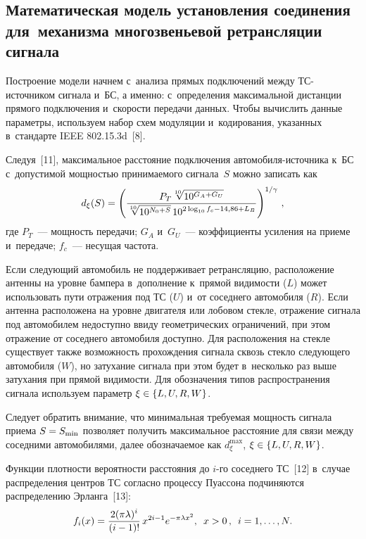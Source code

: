 \begin{multicols}{2}
\section{Математическая модель установления соединения 
для~механизма многозвеньевой ретрансляции сигнала}

     Построение модели начнем с~анализа прямых подключений между  
ТС-ис\-точ\-ни\-ком сигнала и~БС, а именно: с~определения максимальной 
дистанции прямого подключения и~скорости передачи данных. Чтобы 
вычислить данные параметры, используем набор схем модуляции 
и~кодирования, указанных в~стандарте IEEE 802.15.3d~[8].
     
     Следуя~[11], максимальное расстояние подключения  
ав\-то\-мо\-би\-ля-ис\-точ\-ни\-ка к~БС с~допустимой мощ\-ностью  
при\-ни\-ма\-емо\-го сигнала~$S$ можно записать как
     \begin{equation}
     d_\xi(S)= \left( \displaystyle\frac{\displaystyle P_T \sqrt[10]{10^{G_A+G_U}}\mathstrut}{\displaystyle \sqrt[10]{10^{N_0+S}}\,10^{2\log_{10} f_c-14{,}86+L_B}\mathstrut} 
\right)^{1/\gamma}\,,
     \label{e2-ost}
     \end{equation}
где $P_T$~--- мощность передачи; $G_A$ и~$G_U$~--- коэффициенты 
усиления на приеме и~передаче; $f_c$~--- 
несущая частота.

     Если следующий автомобиль не поддерживает ретрансляцию, 
расположение антенны на уровне бампера в~дополнение к~прямой видимости 
($L$) может использовать пути отражения под ТС ($U$) и~от соседнего 
автомобиля ($R$). Если антенна расположена на уровне двигателя или 
лобовом стекле, отражение сигнала под автомобилем недоступно ввиду 
геометрических ограничений, при этом отражение от соседнего автомобиля 
доступно. Для расположения на стекле существует также возможность 
прохождения сигнала сквозь стекло следующего автомобиля ($W$), но 
затухание сигнала при этом будет в~несколько раз выше затухания при 
прямой видимости. Для обозначения типов распространения сигнала 
используем параметр $\xi \hm\in \{L,U,R,W\}$.
     
     Следует обратить внимание, что минимальная требуемая мощность 
сигнала приема $S\hm= S_{\min}$ позволяет получить максимальное 
расстояние для связи между соседними автомобилями, далее обозначаемое 
как $d_\xi^{\max}$, $\xi\hm\in \{L,U,R,W\}$.
     
     Функции плотности вероятности расстояния до $i$-го соседнего 
ТС~[12] в~случае распределения цент\-ров ТС согласно процессу Пуассона 
подчиняются распределению Эрланга~[13]:
     \begin{equation*}
     f_i(x)=\displaystyle\frac{\displaystyle 2(\pi\lambda)^i\mathstrut}{\displaystyle (i-1)!\mathstrut}\,x^{2i-1} e^{-\pi \lambda x^2} ,\enskip 
x>0\,,\enskip i=1,\ldots , N.
     \end{equation*}
     

\end{multicols}
